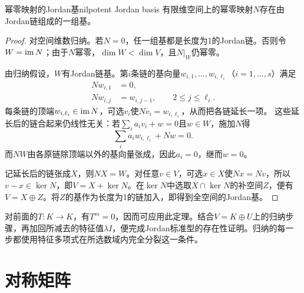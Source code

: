 \begin{theorem}{幂零映射的Jordan基}{nilpotent Jordan basis}
    有限维空间上的幂零映射$N$存在由Jordan链组成的一组基。
\end{theorem}
\begin{proof}
    对空间维数归纳。若$N = 0$，任一组基都是长度为1的Jordan链。否则令$W = \operatorname{im} N$；由于$N$幂零，$\dim W < \dim V$，且$N|_W$仍幂零。

    由归纳假设，$W$有Jordan链基。第$i$条链的基向量$w_{i,1},\ldots,w_{i,\ell_i}$（$i = 1,\ldots,s$）满足
    \begin{subequations}\label{eq:la-nilpotent-chain}
        \begin{align}
            Nw_{i,1} &= 0,\\
            Nw_{i,j} &= w_{i,j-1},\qquad 2 \le j \le \ell_i.
        \end{align}
    \end{subequations}
    每条链的顶端$w_{i,\ell_i} \in \operatorname{im} N$，可选$v_i$使$Nv_i = w_{i,\ell_i}$，从而把各链延长一项。
    这些延长后的链合起来仍线性无关：若$\textstyle\sum_i a_iv_i + w = 0$且$w \in W$，施加$N$得
    \[
        \sum_i a_iw_{i,\ell_i} + Nw = 0.
    \]
    而$NW$由各原链除顶端以外的基向量张成，因此$a_i = 0$，继而$w = 0$。

    记延长后的链张成$X$，则$NX = W$。对任意$v \in V$，可选$x \in X$使$Nx = Nv$，所以$v - x \in \ker N$，即$V = X + \ker N$。在$\ker N$中选取$X \cap \ker N$的补空间$Z$，便有$V = X \oplus Z$。将$Z$的基作为长度为1的链加入，即得到全空间的Jordan基。
\end{proof}

对前面的$T:K \to K$，有$T^m = 0$，因而可应用此定理。结合$V = K \oplus U$上的归纳步骤，再加回所减去的特征值$\lambda I$，便完成Jordan标准型的存在性证明。归纳的每一步都使用特征多项式在所选数域内完全分裂这一条件。

\section{对称矩阵}

